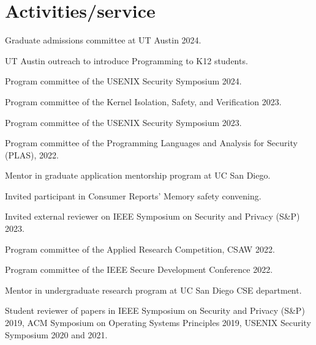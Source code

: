 \section{Activities/service}

{ Graduate admissions committee at UT Austin 2024. }

{ UT Austin
outreach to introduce Programming to K12 students. }

{ Program committee of the USENIX Security Symposium 2024. }

{ Program committee of the Kernel Isolation, Safety, and Verification 2023. }

{ Program committee of the USENIX Security Symposium 2023. }

{ Program committee of the Programming Languages and Analysis for Security (PLAS), 2022. }

{ Mentor in 
graduate application mentorship program at UC San Diego. }

{ Invited participant in Consumer Reports' Memory safety convening. }

{ Invited external reviewer on IEEE Symposium on Security and Privacy (S\&P) 2023.}

{ Program committee of the Applied Research Competition, CSAW 2022. }

{ Program committee of the IEEE Secure Development Conference 2022. }

{ Mentor in  undergraduate research program at UC San Diego CSE department. }

{ Student reviewer of papers in IEEE Symposium on Security and Privacy (S\&P)
2019, ACM Symposium on Operating Systems Principles 2019, USENIX Security
Symposium 2020 and 2021. }
